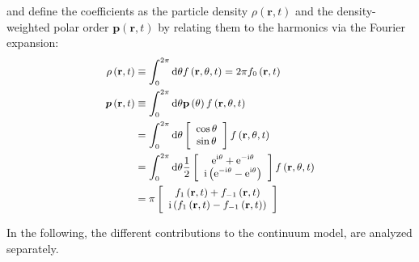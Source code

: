 \documentclass[a4paper, amsfonts, amssymb, amsmath, reprint, showkeys, showpacs, nofootinbib, twoside]{revtex4-2}
\begin{document}
and define the coefficients  as the particle density $ \rho\left(\mathbf{r}, t\right)$ and the density-weighted polar order $\boldsymbol{p}\left(\mathbf{r}, t\right)$ by relating them to the harmonics via the Fourier expansion:
\begin{subequations}
    \small
    \begin{align}
        \rho \left( \mathbf{r},t \right) &\equiv \int_0^{2\pi}{\mathrm{d}\theta f\left( \mathbf{r},\theta ,t \right)}=2\pi f_{0}\left( \mathbf{r},t \right)
        \label{eq:particleDensity}
        \\
        \boldsymbol{p}\left( \mathbf{r},t \right) &\equiv \int_0^{2\pi}{\mathrm{d}\theta \mathbf{p}\left( \theta \right) f\left( \mathbf{r},\theta ,t \right)}\notag\\
        &=\int_0^{2\pi}{\mathrm{d}\theta \left[ \begin{array}{c}
        \cos \theta\\
        \sin \theta\\
    \end{array} \right] f\left( \mathbf{r},\theta ,t \right)}
    \notag \\
    &=\int_0^{2\pi}{\mathrm{d}\theta \frac{1}{2}\left[ \begin{array}{c}
        \mathrm{e}^{\mathrm{i}\theta}+\mathrm{e}^{-\mathrm{i}\theta}\\
        \mathrm{i}\left( \mathrm{e}^{-\mathrm{i}\theta}-\mathrm{e}^{\mathrm{i}\theta} \right)\\
    \end{array} \right] f\left( \mathbf{r},\theta ,t \right)}\notag\\
        &=\pi \left[ \begin{array}{c}
        f_{1}\left( \mathbf{r},t \right) +f_{-1}\left( \mathbf{r},t \right)\\
        \mathrm{i}\left( f_{1}\left( \mathbf{r},t \right) -f_{-1}\left( \mathbf{r},t \right) \right)\\
    \end{array} \right]
    \label{eq:polarOrder}
    \end{align}
\end{subequations}

In the following, the different contributions to the continuum model, are analyzed separately.
\end{document}
